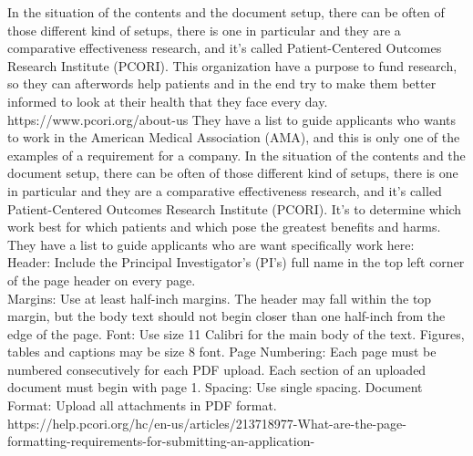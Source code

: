 In the situation of the contents and the document setup, there can be often of those different kind of setups,
there is one in particular and they are a comparative effectiveness research, and it's called
Patient-Centered Outcomes Research Institute (PCORI).
This organization have a purpose to fund research, so they can afterwords help patients and in the end try to make them better
informed to look at their health that they face every day.
https://www.pcori.org/about-us
They have a list to guide applicants who wants to work in the American Medical Association (AMA),
and this is only one of the examples of a requirement for a company.
In the situation of the contents and the document setup, there can be often of those different kind of setups,
there is one in particular and they are a comparative effectiveness research, and it's called
Patient-Centered Outcomes Research Institute (PCORI).
It's to determine which work best for which patients and which pose the greatest benefits and harms. %
They have a list to guide applicants who are want specifically work here: \\

Header: Include the Principal Investigator’s (PI’s) full name in the top left corner of the page header on every page. \\
Margins: Use at least half-inch margins. The header may fall within the top margin, but the body text should not begin closer than one half-inch from the edge of the page.
Font: Use size 11 Calibri for the main body of the text. Figures, tables and captions may be size 8 font.
Page Numbering: Each page must be numbered consecutively for each PDF upload. Each section of an uploaded document must begin with page 1.
Spacing: Use single spacing.
Document Format: Upload all attachments in PDF format. \\
https://help.pcori.org/hc/en-us/articles/213718977-What-are-the-page-formatting-requirements-for-submitting-an-application-

